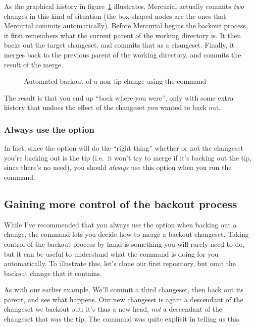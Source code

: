 As the graphical history in figure~\ref{fig:undo:backout-non-tip}
illustrates, Mercurial actually commits \emph{two} changes in this
kind of situation (the box-shaped nodes are the ones that Mercurial
commits automatically).  Before Mercurial begins the backout process,
it first remembers what the current parent of the working directory
is.  It then backs out the target changeset, and commits that as a
changeset.  Finally, it merges back to the previous parent of the
working directory, and commits the result of the merge.


\begin{figure}[htb]
  \centering
  \caption{Automated backout of a non-tip change using the  command}
  \label{fig:undo:backout-non-tip}
\end{figure}

The result is that you end up ``back where you were'', only with some
extra history that undoes the effect of the changeset you wanted to
back out.

\subsubsection{Always use the  option}

In fact, since the  option will do the ``right
thing'' whether or not the changeset you're backing out is the tip
(i.e.~it won't try to merge if it's backing out the tip, since there's
no need), you should \emph{always} use this option when you run the
 command.

\subsection{Gaining more control of the backout process}

While I've recommended that you always use the
 option when backing out a change, the
 command lets you decide how to merge a backout
changeset.  Taking control of the backout process by hand is something
you will rarely need to do, but it can be useful to understand what
the  command is doing for you automatically.  To
illustrate this, let's clone our first repository, but omit the
backout change that it contains.

As with our earlier example, We'll commit a third changeset, then back
out its parent, and see what happens.
Our new changeset is again a descendant of the changeset we backout
out; it's thus a new head, \emph{not} a descendant of the changeset
that was the tip.  The  command was quite explicit in
telling us this.

